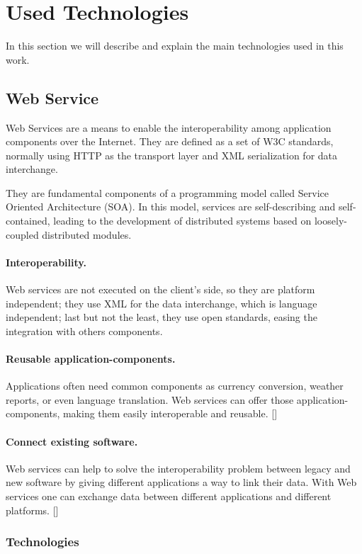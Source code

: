 \section{Used Technologies}
\label{used-technologies}
In this section we will describe and explain the main technologies used in this work.

\subsection{Web Service}
Web Services are a means to enable the interoperability among application components over the Internet.  They are defined as a set of W3C standards, normally using HTTP as the transport layer and XML serialization for data interchange.

They are fundamental components of a programming model called Service Oriented Architecture (SOA). In this model, services are self-describing and self-contained, leading to the development of distributed systems based on loosely-coupled distributed modules.

\paragraph{Interoperability.}
Web services are not executed on the client's side, so they are platform independent; they use XML for the data interchange, which is language independent; last but not the least, they use open standards, easing the integration with others components.

\paragraph{Reusable application-components.}
Applications often need common components as currency conversion, weather reports, or even language translation. Web services can offer those application-components, making them easily interoperable and reusable.  [\citet{WST}]

\paragraph{Connect existing software.}
Web services can help to solve the interoperability problem between legacy and new software by giving different applications a way to link their data. With Web services one can exchange data between different applications and different platforms. [\citet{WST}]

\subsubsection{Technologies}

